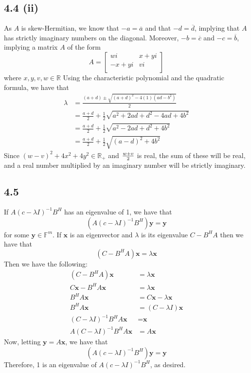 \documentclass[letterpaper,12pt]{article}
\theoremstyle{definition}
\begin{document}
\subsection*{4.4 (ii)}


As $A$ is skew-Hermitian, we know that $-a = \overline a$ and that $-d = \overline d$, implying that $A$ has strictly imaginary numbers on the diagonal. Moreover, $-b = \overline c$ and $-c = \overline b$, implying a matrix $A$ of the form
\[A = 
\begin{bmatrix}
    wi & x + yi \\
    -x + yi  &vi \\
\end{bmatrix}\]
where $x,y,v,w \in \mathbb{R}$
Using the characteristic polynomial and the quadratic formula, we have that
\begin{align*}
 \lambda &= \frac{(a+d) \pm \sqrt{(a+d)^2 - 4(1)(ad-b^2)    }   }{    2} \\&= \frac{a+d}{2}+\frac{1}{2}\sqrt{a^2 + 2ad + d^2 -4ad + 4b^2} \\&= \frac{a+d}{2}+\frac{1}{2}\sqrt{a^2 - 2ad + d^2 + 4b^2 } \\&= \frac{a+d}{2}+\frac{1}{2}\sqrt{(a-d)^2 + 4b^2  }
\end{align*}
Since $(w-v)^2 +4x^2  +4y^2 \in \mathbb{R}_+$ and ${w+v} \over 2$ is real, the sum of these will be real, and a real number multiplied by an imaginary number will be strictly imaginary. 

\subsection*{4.5}
If $A(c-\lambda I)^{-1}B^H$ has an eigenvalue of 1, we have that 
\[(A(c-\lambda I)^{-1}B^H)\textbf{y} = \textbf{y}\]
for some $\textbf{y} \in \mathbb{F}^m$. If $\textbf{x}$ is an eigenvector and $\lambda$ is its eigenvalue  $C-B^HA$ then we have that \[(C-B^HA)\textbf{x} = \lambda \textbf{x}\] Then we have the following:
\begin{align*}
        (C-B^HA)\textbf{x} &= \lambda \textbf{x} \\
            C\textbf{x}-B^HA\textbf{x} &= \lambda \textbf{x} \\
                B^HA\textbf{x} &= C\textbf{x} - \lambda \textbf{x} \\
                    B^HA\textbf{x} &= (C- \lambda I)\textbf{x} \\
                        (C- \lambda I)^{-1} B^HA\textbf{x} &= \textbf{x} \\
                            A(C- \lambda I)^{-1} B^HA\textbf{x} &= A\textbf{x} 
                        \end{align*}
                        Now, letting $\textbf{y} = A\textbf{x}$, we have that \[(A(c-\lambda I)^{-1}B^H)\textbf{y} = \textbf{y}\]
                        Therefore, 1 is an eigenvalue of $A(c-\lambda I)^{-1}B^H$, as desired.
\end{document}
